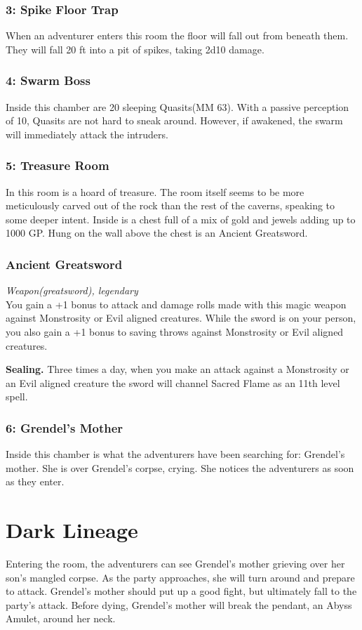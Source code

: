 \documentclass[10pt,twoside,twocolumn,openany]{book}
\begin{document}
\subsubsection{3: Spike Floor Trap}
When an adventurer enters this room the floor will fall out from beneath them. They will fall 20 ft into a pit of spikes, taking 2d10 damage.

\subsubsection{4: Swarm Boss}
Inside this chamber are 20 sleeping Quasits(MM 63). With a passive perception of 10, Quasits are not hard to sneak around. However, if awakened, the swarm will immediately attack the intruders.

\subsubsection{5: Treasure Room}
In this room is a hoard of treasure. The room itself seems to be more meticulously carved out of the rock than the rest of the caverns, speaking to some deeper intent. Inside is a chest full of a mix of gold and jewels adding up to 1000 GP. Hung on the wall above the chest is an Ancient Greatsword.

\subsubsection{Ancient Greatsword}
\textit{Weapon(greatsword), legendary}\\
You gain a +1 bonus to attack and damage rolls made with this magic weapon against Monstrosity or Evil aligned creatures. While the sword is on your person, you also gain a +1 bonus to saving throws against Monstrosity or Evil aligned creatures.

\indent\textbf{Sealing.} Three times a day, when you make an attack against a Monstrosity or an Evil aligned creature the sword will channel Sacred Flame as an 11th level spell.

\subsubsection{6: Grendel's Mother}
Inside this chamber is what the adventurers have been searching for: Grendel's mother. She is over Grendel's corpse, crying. She notices the adventurers as soon as they enter.

\section{Dark Lineage}
Entering the room, the adventurers can see Grendel's mother grieving over her son's mangled corpse. As the party approaches, she will turn around and prepare to attack. Grendel's mother should put up a good fight, but ultimately fall to the party's attack. Before dying, Grendel's mother will break the pendant, an Abyss Amulet, around her neck.
\end{document}
